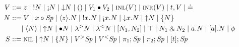 \begin{align*}
V & ::= z                     %
   \mid \tbangr{N}            %
   \mid \tgnabr{N}            %
   \mid \tdownr{N}            %
%
   \mid \toner
   \mid \tfuser{V_1}{V_2}     %
%  
   \mid \tinl{V}
   \mid \tinr{V}
   \mid \texistsr{t}{V}
   \mid \tunifr
 \\
N & ::= \tfocusr{V}           %
   \mid \tfocusl{x}{\Sp}      %
   \mid \tetap{z}{N}          %
   \mid \tbangl{x}{N}         %
   \mid \tgnabl{x}{N}         %
   \mid \tdownl{x}{N}         %
   \mid \tupr{N}              %
   \mid \tlaxr{N}             %
\\ & ~~~~ %
   \mid \tetan{N} 
   \mid \tupr{N}
   \mid \tfusel{N}            %
   \mid \tlamr{N}             %
   \mid \tlaml{N}             %
%
   \mid \toplusl{N_1}{N_2}    %
   \mid \ttopr 
   \mid \twithr{N_1}{N_2}     %
   \mid \texistsl{a}{N}
   \mid \tforallr{a}{N}
   \mid \phi
\\
S & ::= \tnil                 %
   \mid \tupl{N}              %
   \mid \tlaxl{N}             %
   \mid \tappr{V}{\Sp}        %
   \mid \tappl{V}{\Sp}        %
   \mid \tpione{\Sp}          %
   \mid \tpitwo{\Sp}          %
   \mid \tforalll{t}{\Sp}
\end{align*}
